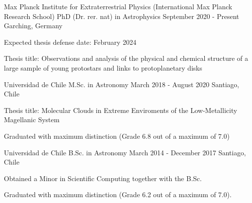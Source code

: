 

\begin{cventries}

 \cventry
    {Max Planck Institute for Extraterrestrial Physics (International Max Planck Research School)} %
    {PhD (Dr. rer. nat) in Astrophysics} %
    {September 2020 - Present} %
    {Garching, Germany} %
    { \begin{cvitems} %
      \item{Expected thesis defense date: February 2024}
      \item{Thesis title: Observations and analysis of the physical and chemical structure of a large sample of young protostars and links to protoplanetary disks}
      \end{cvitems}
      }


 \cventry
    {Universidad de Chile} %
    {M.Sc. in Astronomy} %
    {March 2018 - August 2020} %
    {Santiago, Chile} %
    {\begin{cvitems} %
    		\item {Thesis title: Molecular Clouds in Extreme Enviroments of the Low-Metallicity Magellanic System}
    		\item {Graduated with maximum distinction (Grade 6.8 out of a maximum of 7.0)}
    	\end{cvitems} }
    

  \cventry
    {Universidad de Chile} %
    {B.Sc. in Astronomy} %
    {March 2014 - December 2017} %
     {Santiago, Chile} %
    {
      \begin{cvitems} %
      \item{Obtained a Minor in Scientific Computing together with the B.Sc.}
       \item {Graduated with maximum distinction (Grade 6.2 out of a maximum of 7.0).}
      \end{cvitems}
    }

\end{cventries}
